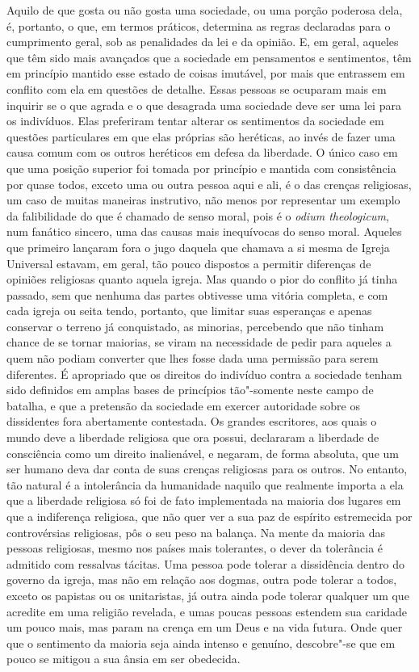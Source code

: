  Aquilo de que gosta ou não gosta uma sociedade, ou uma porção poderosa dela, é,
portanto, o que, em termos práticos, determina as
regras declaradas para o cumprimento geral, sob as penalidades da lei e
da opinião. E, em geral, aqueles que têm sido mais avançados que a
sociedade em pensamentos e sentimentos, têm em princípio mantido esse estado de
coisas imutável, por mais que entrassem em conflito
com ela em questões de detalhe. Essas pessoas se ocuparam mais em
inquirir se o que agrada e o que desagrada uma sociedade deve ser uma lei para
os indivíduos. Elas preferiram tentar alterar os sentimentos da
sociedade em questões particulares em que elas próprias 
são heréticas, ao invés de fazer uma causa comum com os outros 
heréticos em defesa da liberdade. O único caso em que uma
posição superior foi tomada por princípio e mantida com consistência
por quase todos, exceto uma ou outra pessoa aqui e ali, é o das crenças
religiosas, um caso de muitas maneiras instrutivo, não menos por
representar um exemplo da falibilidade do que é chamado de senso moral,
pois é o \textit{odium theologicum}, num fanático sincero, uma das
causas mais inequívocas do senso moral. Aqueles que primeiro lançaram
fora o jugo daquela que chamava a si mesma de Igreja Universal estavam,
em geral, tão pouco dispostos a permitir diferenças de opiniões
religiosas quanto aquela igreja. Mas quando o pior do conflito já tinha
passado, sem que nenhuma das partes obtivesse uma vitória
completa, e com cada igreja ou seita tendo, portanto, que limitar suas
esperanças e apenas conservar o terreno já conquistado, as minorias,
percebendo que não tinham chance de se tornar maiorias, se viram na
necessidade de pedir para aqueles a quem não podiam converter que
lhes fosse dada uma permissão para serem diferentes. É apropriado que 
os direitos do indivíduo contra a sociedade tenham sido definidos em 
amplas bases de princípios tão"-somente neste 
campo de batalha, e que a pretensão da sociedade em exercer
autoridade sobre os dissidentes fora abertamente contestada. Os
grandes escritores, aos quais o mundo deve a liberdade religiosa que ora
possui, declararam a liberdade de consciência como um direito
inalienável, e negaram, de forma absoluta, que um ser humano deva dar
conta de suas crenças religiosas para os outros. No entanto, tão natural é
a intolerância da humanidade naquilo que realmente importa a ela que a
liberdade religiosa só foi de fato implementada na maioria dos lugares
em que a indiferença religiosa, que não quer ver a sua paz de espírito
estremecida por controvérsias religiosas, pôs o seu peso na balança. Na
mente da maioria das pessoas religiosas, mesmo nos países mais
tolerantes, o dever da tolerância é admitido com ressalvas tácitas. Uma
pessoa pode tolerar a dissidência dentro do governo da igreja, mas não
em relação aos dogmas, outra pode tolerar a todos, exceto os papistas
ou os unitaristas, já outra ainda pode tolerar qualquer um que acredite em 
uma religião revelada, e umas poucas pessoas estendem sua caridade um
pouco mais, mas param na crença em um Deus e na vida futura. Onde quer
que o sentimento da maioria seja ainda intenso e genuíno, descobre"-se
que em pouco se mitigou a sua ânsia em ser obedecida. 

